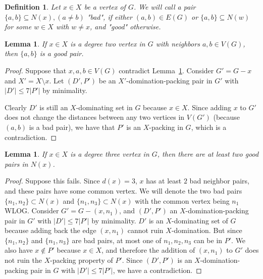 \documentclass[a4paper, 12pt]{article}
\newtheorem{definition}{Definition}
\newtheorem{lemma}[theorem]{Lemma}
\begin{document}
\begin{definition}

    Let $x \in X$ be a vertex of $G$.
    We will call a pair $\{a, b\} \subseteq N(x), (a\neq b)$ "bad", if either $(a,b)\in E(G)$ or $\{a,b\} \subseteq N(w)$ for some $w \in X $ with $ w \not = x$, and "good" otherwise.
\end{definition}

\begin{lemma}\label{lem:good_nbr_2}
    If $x \in X$ is a degree two vertex in $G$ with neighbors $a,b \in V(G)$, then $\{a,b\}$ is a good pair.
\end{lemma}

\begin{proof}
Suppose that $x, a, b \in V(G)$ contradict Lemma~\ref{lem:good_nbr_2}.
Consider $G' = G - x$ and $X' = X \setminus x$. Let $(D', P')$ be an $X'$-domination-packing pair in $G'$ with $\vert D'\vert \leq 7\vert P' \vert$ by minimality.

Clearly $D'$ is still an $X$-dominating set in $G$ because $x \in X$. Since adding $x$ to $G'$ does not change the distances between any two vertices in $V(G')$ (because $(a,b)$ is a bad pair), we have that $P'$ is an $X$-packing in $G$, which is a contradiction.
\end{proof}

\begin{lemma}\label{lem:good_nbr_3}
    If $x \in X$ is a degree three vertex in $G$, then there are at least two good pairs in $N(x)$.
\end{lemma}

\begin{proof}

Suppose this fails. Since $d(x) = 3$, $x$ has at least $2$ bad neighbor pairs, and these pairs have some common vertex. We will denote the two bad pairs $\{n_1, n_2\} \subset N(x)$ and $\{n_1, n_3\} \subset N(x)$ with the common vertex being $n_1$ WLOG. Consider $G' = G-(x,n_1)$, and $(D',P')$ an $X$-domination-packing pair in $G'$ with $\vert D'\vert \leq 7\vert P' \vert$ by minimality. $D'$ is an $X$-dominating set of $G$ because adding back the edge $(x,n_1)$ cannot ruin $X$-domination. But since $\{n_1, n_2\}$ and $\{n_1, n_3\}$ are bad pairs, at most one of $n_1, n_2, n_3$ can be in $P'$. We also have $x \not \in P'$ because $x \in X$, and therefore the addition of $(x, n_1)$ to $G'$ does not ruin the $X$-packing property of $P'$. Since $(D',P')$ is an $X$-domination-packing pair in $G$ with $\vert D'\vert \leq 7\vert P' \vert$, we have a contradiction.
\end{proof}
\end{document}
